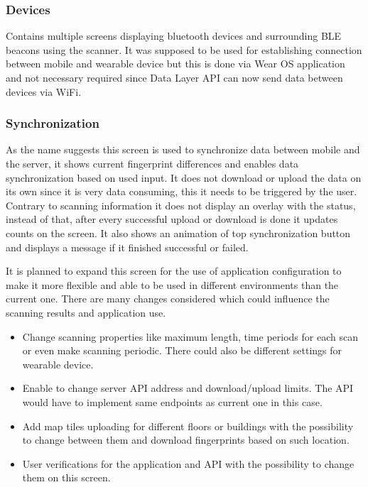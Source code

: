 \subsubsection{Devices}\label{subsec:Devices}
Contains multiple screens displaying bluetooth devices and surrounding BLE beacons using the scanner. It was supposed to be used for establishing connection between mobile and wearable device but this is done via Wear OS application and not necessary required since Data Layer API can now send data between devices via WiFi.

\subsubsection{Synchronization}\label{subsec:Synchronization}
As the name suggests this screen is used to synchronize data between mobile and the server, it shows current fingerprint differences and enables data synchronization based on used input. It does not download or upload the data on its own since it is very data consuming, this it needs to be triggered by the user. Contrary to scanning information it does not display an overlay with the status, instead of that, after every successful upload or download is done it updates counts on the screen. It also shows an animation of top synchronization button and displays a message if it finished successful or failed.


It is planned to expand this screen for the use of application configuration to make it more flexible and able to be used in different environments than the current one. There are many changes considered which could influence the scanning results and application use.

\begin{itemize}
	\item Change scanning properties like maximum length, time periods for each scan or even make scanning periodic. There could also be different settings for wearable device.
	\item Enable to change server API address and download/upload limits. The API would have to implement same endpoints as current one in this case.
	\item Add map tiles uploading for different floors or buildings with the possibility to change between them and download fingerprints based on such location.
	\item User verifications for the application and API with the possibility to change them on this screen.
\end{itemize}

